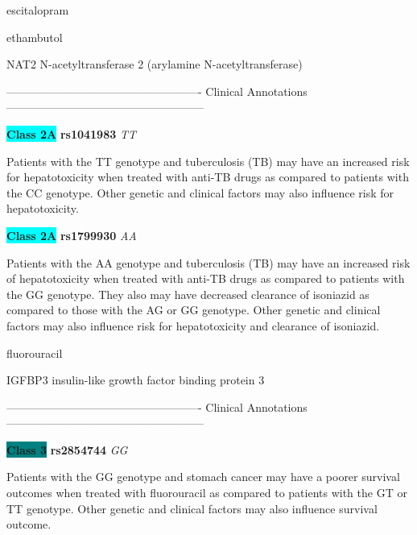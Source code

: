 \documentclass{resume} %
\begin{document}
\begin{rSection}{ escitalopram }
\end{rSection}\begin{rSection}{ ethambutol }
\item[]

\begin{rSubsection}{ NAT2 }{ N-acetyltransferase 2 (arylamine N-acetyltransferase) }{}{}
\item[]

\item[] ---------------------------------------------------- Clinical Annotations -----------------------------------------------------\newline
\item \textbf{\colorbox{cyan} {Class 2A}} \textbf{ rs1041983 } \textit{ TT }
\item[] Patients with the TT genotype and tuberculosis (TB) may have an increased risk for hepatotoxicity when treated with anti-TB drugs as compared to patients with the CC genotype. Other genetic and clinical factors may also influence risk for hepatotoxicity.\item \textbf{\colorbox{cyan} {Class 2A}} \textbf{ rs1799930 } \textit{ AA }
\item[] Patients with the AA genotype and tuberculosis (TB) may have an increased risk of hepatotoxicity when treated with anti-TB drugs as compared to patients with the GG genotype. They also may have decreased clearance of isoniazid as compared to those with the AG or GG genotype. Other genetic and clinical factors may also influence risk for hepatotoxicity and clearance of isoniazid.
\end{rSubsection}

\end{rSection}\begin{rSection}{ fluorouracil }
\item[]

\begin{rSubsection}{ IGFBP3 }{ insulin-like growth factor binding protein 3 }{}{}
\item[]

\item[] ---------------------------------------------------- Clinical Annotations -----------------------------------------------------\newline
\item \textbf{\colorbox{teal} {Class 3}} \textbf{ rs2854744 } \textit{ GG }
\item[] Patients with the GG genotype and stomach cancer may have a poorer survival outcomes when treated with fluorouracil as compared to patients with the GT or TT genotype. Other genetic and clinical factors may also influence survival outcome.
\end{rSubsection}


\end{rSection}
\end{document}
